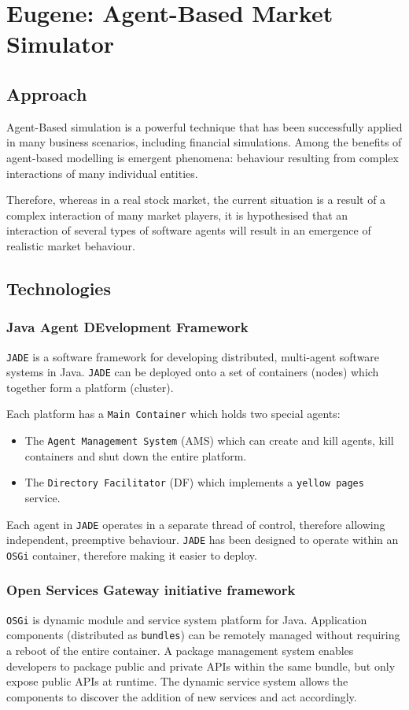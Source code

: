 \section{Eugene: Agent-Based Market Simulator}

\subsection{Approach}
Agent-Based simulation is a powerful technique that has been successfully applied in many business scenarios, including financial simulations. Among the benefits of agent-based modelling is emergent phenomena: behaviour resulting from complex interactions of many individual entities. 

Therefore, whereas in a real stock market, the current situation is a result of a complex interaction of many market players, it is hypothesised that an interaction of several types of software agents will result in an emergence of realistic market behaviour.

\subsection{Technologies}
\subsubsection{Java Agent DEvelopment Framework}
\texttt{JADE} is a software framework for developing distributed, multi-agent software systems in Java. \texttt{JADE} can be deployed onto a set of containers (nodes) which together form a platform (cluster).

Each platform has a \texttt{Main Container} which holds two special agents:
\begin{itemize}
\item The \texttt{Agent Management System} (AMS) which can create and kill agents, kill containers and shut down the entire platform.
\item The \texttt{Directory Facilitator} (DF) which implements a \texttt{yellow pages} service.
\end{itemize} 

Each agent in \texttt{JADE} operates in a separate thread of control, therefore allowing independent, preemptive behaviour. \texttt{JADE}  has been designed to operate within an \texttt{OSGi} container, therefore making it easier to deploy.

\subsubsection{Open Services Gateway initiative framework}
\texttt{OSGi} is dynamic module and service system platform for Java. Application components (distributed as \texttt{bundles}) can be remotely managed without requiring a reboot of the entire container. A package management system enables developers to package public and private APIs within the same bundle, but only expose public APIs at runtime. The dynamic service system allows the components to discover the addition of new services and act accordingly.

